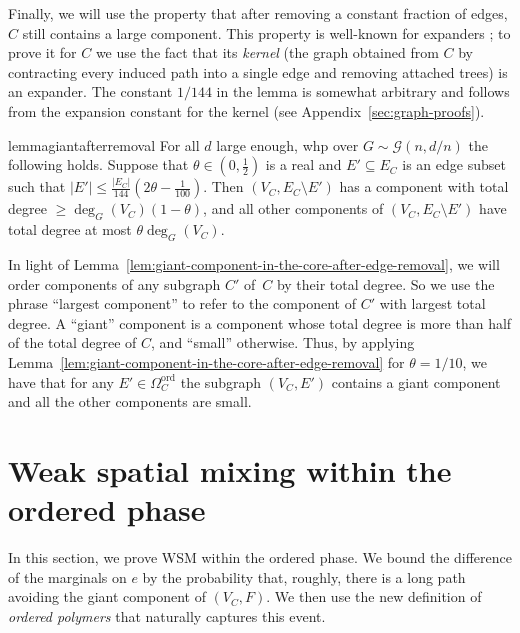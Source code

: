 \documentclass[11pt]{article}
\theoremstyle{plain}
\newcommand{\G}{\mathcal{G}}
\newcommand{\1}{\mathbb{1}}
\newcommand{\ord}{\mathrm{ord}}
\begin{document}
Finally, we will use the property that after removing a constant fraction of edges, \(C\) still contains a large component. This property is well-known for expanders \cite{trevisan2016expanders}; to prove it for \(C\) we use the fact that its \textit{kernel} (the graph obtained from \(C\) by contracting every induced path into a single edge and removing attached trees) is an expander. The constant \({1}/{144}\) in the lemma is somewhat arbitrary and follows from the expansion constant for the kernel (see Appendix~\ref{sec:graph-proofs}).




\begin{restatable}{lemma}{giantafterremoval}\label{lem:giant-component-in-the-core-after-edge-removal}\label{lem:short}
    For all \(d\) large enough, whp over \(G\sim\G(n,d/n)\) the following holds.
    Suppose that \(\theta \in (0,\tfrac 12)\) is a real and \(E'\subseteq E_C\) is an edge subset such that \(|E'|\leq \frac{|E_C|}{144}\left(2\theta-\frac{1}{100}\right)\).
    Then \((V_C,E_C\setminus E')\) has 
a component with total degree \(\geq \deg_G(V_C)(1-\theta)\), and all other components of \((V_C,E_C\setminus E')\) have total degree at most \(\theta \deg_G(V_C)\). 
\end{restatable}


In light of Lemma~\ref{lem:giant-component-in-the-core-after-edge-removal}, we will order components of any subgraph $C'$ of~$C$ by their total degree. So we use the phrase ``largest component'' to refer to the component of $C'$ with largest total degree. A ``giant'' component  is a component whose total degree is more than half of the total degree of $C$, and ``small'' otherwise. 
Thus, by applying Lemma~\ref{lem:giant-component-in-the-core-after-edge-removal} for $\theta=1/10$, we have that for any $E'\in \Omega^{\ord}_C$  the subgraph $(V_C,E')$ contains a giant component and all the other components are small.

 
 


\section{Weak spatial mixing within the ordered phase}\label{sec:ordered}

In this section, we prove  WSM within the ordered phase. We bound the difference of the marginals on \(e\) by the probability that, roughly, there is a long path avoiding the giant component of \((V_C,F)\). We then use the new definition of \textit{ordered polymers} that naturally captures this event.
\end{document}

